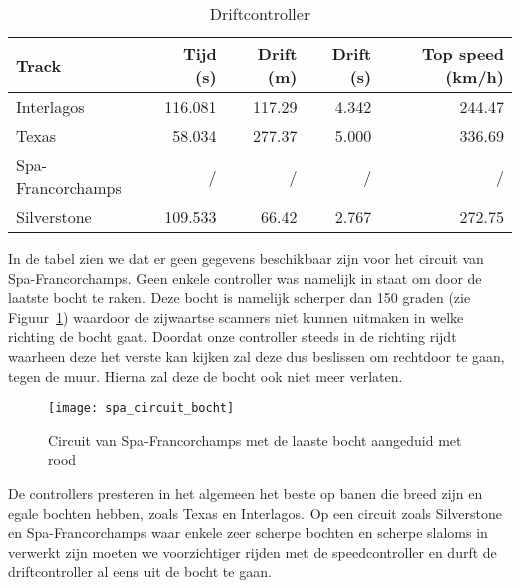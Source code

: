 \begin{table}
   	\begin{subtable}{\linewidth}
   		\centering
   		\caption{Driftcontroller}
   		\label{tbl:resultsdrift}
   	    \begin{tabular}{lrrrr}
   	    \toprule
       	Track             & Tijd (s) & Drift (m) & Drift (s) & Top speed  
       	(km/h) \\
   	    \midrule
       	Interlagos        & 116.081 & 117.29 & 4.342 & 244.47 \\
       	Texas             &  58.034 & 277.37 & 5.000 & 336.69 \\
       	Spa-Francorchamps &       / &      / &     / &      / \\
       	Silverstone       & 109.533 &  66.42 & 2.767 & 272.75 \\
   	    \bottomrule
   	    \end{tabular}
   	\end{subtable}
\end{table}

In de tabel zien we dat er geen gegevens beschikbaar zijn voor het circuit van Spa-Francorchamps. Geen enkele controller was namelijk in staat om door de laatste bocht te raken. Deze bocht is namelijk scherper dan 150 graden (zie Figuur~\ref{fig:spa}) waardoor de zijwaartse scanners niet kunnen uitmaken in welke richting de bocht gaat. Doordat onze controller steeds in de richting rijdt waarheen deze het verste kan kijken zal deze dus beslissen om rechtdoor te gaan, tegen de muur. Hierna zal deze de bocht ook niet meer verlaten.

\begin{figure}[h]
\centering
\texttt{[image: spa\_circuit\_bocht]}
\caption{Circuit van Spa-Francorchamps met de laaste bocht aangeduid met rood}\label{fig:spa}
\end{figure}

De controllers presteren in het algemeen het beste op banen die breed zijn en 
egale bochten hebben, zoals Texas en Interlagos. Op een circuit zoals 
Silverstone en Spa-Francorchamps waar enkele zeer scherpe bochten en scherpe 
slaloms in verwerkt zijn moeten we voorzichtiger rijden met de speedcontroller en durft de driftcontroller al eens uit de bocht te gaan.




